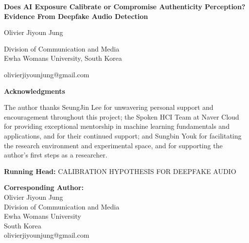 \documentclass[12pt, letterpaper]{article}
\begin{document}
\begin{center}

\vspace*{2cm}

\Large\textbf{Does AI Exposure Calibrate or Compromise Authenticity
Perception? Evidence From Deepfake Audio Detection}

\vspace{2em}

\normalsize
Olivier Jiyoun Jung

\vspace{0.5em}

Division of Communication and Media\\
Ewha Womans University, South Korea

\vspace{0.5em}

olivierjiyounjung@gmail.com

\end{center}

\vspace{4em}

\noindent\textbf{Acknowledgments}

\vspace{0.5em}

\noindent The author thanks SeungJin Lee for unwavering personal support
and encouragement throughout this project; the Spoken HCI Team at Naver
Cloud for providing exceptional mentorship in machine learning
fundamentals and applications, and for their continued support; and
Sungbin Youk for facilitating the research environment and experimental
space, and for supporting the author's first steps as a researcher.

\vspace{2em}

\noindent\textbf{Running Head:} CALIBRATION HYPOTHESIS FOR DEEPFAKE AUDIO

\vspace{1em}

\noindent\textbf{Corresponding Author:}\\
Olivier Jiyoun Jung\\
Division of Communication and Media\\
Ewha Womans University\\
South Korea\\
olivierjiyounjung@gmail.com
\end{document}

